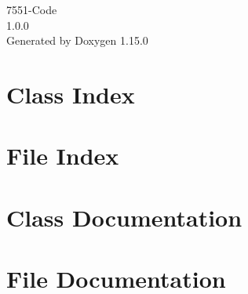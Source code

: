 \documentclass[twoside]{book}
\newcommand{\+}{\discretionary{\mbox{\scriptsize$\hookleftarrow$}}{}{}}
\newcommand{\clearemptydoublepage}{%
    \newpage{\pagestyle{empty}\cleardoublepage}%
  }
\begin{document}
  \raggedbottom
    \hypersetup{pageanchor=false,
                bookmarksnumbered=true,
                pdfencoding=unicode
               }
  \begin{titlepage}
  \vspace*{7cm}
  \begin{center}%
  {\Large 7551-\/\+Code}\\
  [1ex]\large 1.\+0.\+0 \\
  \vspace*{1cm}
  {\large Generated by Doxygen 1.15.0}\\
  \end{center}
  \end{titlepage}
  \clearemptydoublepage
  \tableofcontents
  \clearemptydoublepage
  \hypersetup{pageanchor=true}

\chapter{Class Index}

\chapter{File Index}

\chapter{Class Documentation}

















\chapter{File Documentation}












  \backmatter
  \newpage
  \clearemptydoublepage
  \printindex
\end{document}
